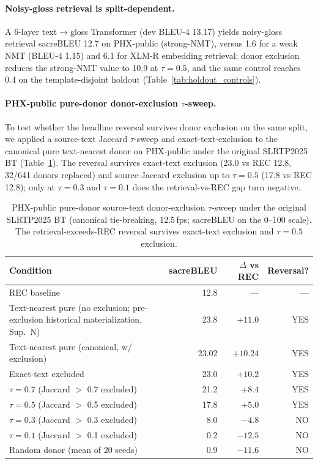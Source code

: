 \documentclass[pdflatex,sn-chicago]{sn-jnl}
\begin{document}
\paragraph{Noisy-gloss retrieval is split-dependent.}
A 6-layer text$\to$gloss Transformer (dev BLEU-4 13.17) yields noisy-gloss retrieval sacreBLEU 12.7 on PHX-public (strong-NMT), versus 1.6 for a weak NMT (BLEU-4 1.15) and 6.1 for XLM-R embedding retrieval; donor exclusion reduces the strong-NMT value to 10.9 at $\tau{=}0.5$, and the same control reaches 0.4 on the template-disjoint holdout (Table~\ref{tab:holdout_controls}).




\paragraph{PHX-public pure-donor donor-exclusion $\tau$-sweep.}
\label{sec:appendix_public_donor_exclusion}
To test whether the headline reversal survives donor exclusion on the same split, we applied a source-text Jaccard $\tau$-sweep and exact-text-exclusion to the canonical pure text-nearest donor on PHX-public under the original SLRTP2025 BT (Table~\ref{tab:pub_tau_sweep}). The reversal survives exact-text exclusion (23.0 vs REC 12.8, 32/641 donors replaced) and source-Jaccard exclusion up to $\tau{=}0.5$ (17.8 vs REC 12.8); only at $\tau{=}0.3$ and $\tau{=}0.1$ does the retrieval-vs-REC gap turn negative.

\begin{table}[t]
\centering
\small
\caption{PHX-public pure-donor source-text donor-exclusion $\tau$-sweep under the original SLRTP2025 BT (canonical tie-breaking, 12.5\,fps; sacreBLEU on the 0--100 scale). The retrieval-exceeds-REC reversal survives exact-text exclusion and $\tau{=}0.5$ exclusion.}
\label{tab:pub_tau_sweep}
\begin{tabular}{lrrr}
\toprule
Condition & sacreBLEU & $\Delta$ vs REC & Reversal? \\
\midrule
REC baseline                             & 12.8 & ---   & --- \\
Text-nearest pure (no exclusion; pre-exclusion historical materialization, Sup.~N) & 23.8 & $+11.0$ & YES \\
Text-nearest pure (canonical, w/ exclusion) & 23.02 & $+10.24$ & YES \\
Exact-text excluded                     & 23.0 & $+10.2$ & YES \\
$\tau{=}0.7$ (Jaccard $>$ 0.7 excluded) & 21.2 & $+8.4$ & YES \\
$\tau{=}0.5$ (Jaccard $>$ 0.5 excluded) & 17.8 & $+5.0$ & YES \\
$\tau{=}0.3$ (Jaccard $>$ 0.3 excluded) & 8.0 & $-4.8$ & NO \\
$\tau{=}0.1$ (Jaccard $>$ 0.1 excluded) & 0.2 & $-12.5$ & NO \\
Random donor (mean of 20 seeds)          & 0.9 & $-11.6$ & NO \\
\bottomrule
\end{tabular}
\end{table}
\end{document}
